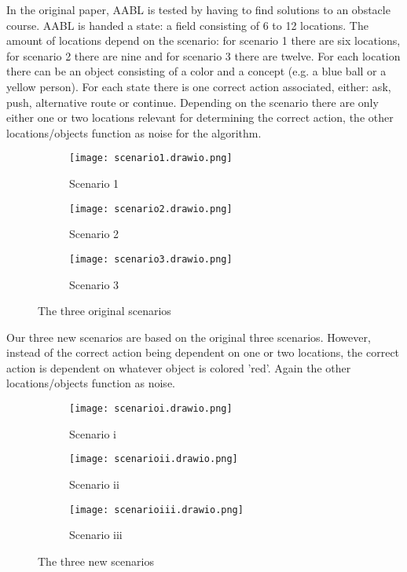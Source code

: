 \documentclass{article}
\begin{document}
In the original paper, AABL is tested by having to find solutions to an obstacle course. AABL is handed a state: a field consisting of 6 to 12 locations. The amount of locations depend on the scenario: for scenario 1 there are six locations, for scenario 2 there are nine and for scenario 3 there are twelve. For each location there can be an object consisting of a color and a concept (e.g. a blue ball or a yellow person). For each state there is one correct action associated, either: ask, push, alternative route or continue. Depending on the scenario there are only either one or two locations relevant for determining the correct action, the other locations/objects function as noise for the algorithm.
\begin{figure}[H]
    \begin{subfigure}[b]{0.55\textwidth}
        \centering
        \texttt{[image: scenario1.drawio.png]}
        \caption*{Scenario 1}
    \end{subfigure}
    \begin{subfigure}[b]{0.55\textwidth}
        \centering
        \texttt{[image: scenario2.drawio.png]}
        \caption*{Scenario 2}
    \end{subfigure}
    \begin{subfigure}[b]{0.55\textwidth}
        \texttt{[image: scenario3.drawio.png]}
        \caption*{Scenario 3}
    \end{subfigure}
    \caption{The three original scenarios}
    \label{fig:scenarios123}
\end{figure}

Our three new scenarios are based on the original three scenarios. However, instead of the correct action being dependent on one or two locations, the correct action is dependent on whatever object is colored 'red'. Again the other locations/objects function as noise.

\begin{figure}[H]
    \begin{subfigure}[b]{0.55\textwidth}
        \centering
        \texttt{[image: scenarioi.drawio.png]}
        \caption*{Scenario i}
    \end{subfigure}
    \begin{subfigure}[b]{0.55\textwidth}
        \centering
        \texttt{[image: scenarioii.drawio.png]}
        \caption*{Scenario ii}
    \end{subfigure}
    \begin{subfigure}[b]{0.55\textwidth}
        \texttt{[image: scenarioiii.drawio.png]}
        \caption*{Scenario iii}
    \end{subfigure}
    \caption{The three new scenarios}
    \label{fig:scenariosiii}
\end{figure}
\end{document}
